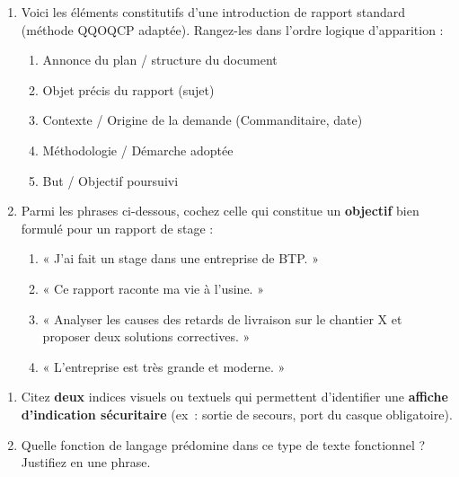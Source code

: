 \documentclass[11pt]{article}
\begin{document}
\begin{exercice}
\begin{enumerate}
    \item Voici les éléments constitutifs d'une introduction de rapport standard (méthode QQOQCP adaptée). Rangez-les dans l'ordre logique d'apparition :
    \begin{enumerate}
        \item Annonce du plan / structure du document
        \item Objet précis du rapport (sujet)
        \item Contexte / Origine de la demande (Commanditaire, date)
        \item Méthodologie / Démarche adoptée
        \item But / Objectif poursuivi
    \end{enumerate}
    \item Parmi les phrases ci-dessous, cochez celle qui constitue un \textbf{objectif} bien formulé pour un rapport de stage :
    \begin{enumerate}
        \item « J'ai fait un stage dans une entreprise de BTP. »
        \item « Ce rapport raconte ma vie à l'usine. »
        \item « Analyser les causes des retards de livraison sur le chantier X et proposer deux solutions correctives. »
        \item « L'entreprise est très grande et moderne. »
    \end{enumerate}
\end{enumerate}
\end{exercice}

\begin{exercice}
\begin{enumerate}
    \item Citez \textbf{deux} indices visuels ou textuels qui permettent d'identifier une \textbf{affiche d'indication sécuritaire} (ex~: sortie de secours, port du casque obligatoire).
    \item Quelle fonction de langage prédomine dans ce type de texte fonctionnel ? Justifiez en une phrase.
\end{enumerate}
\end{exercice}
\end{document}
